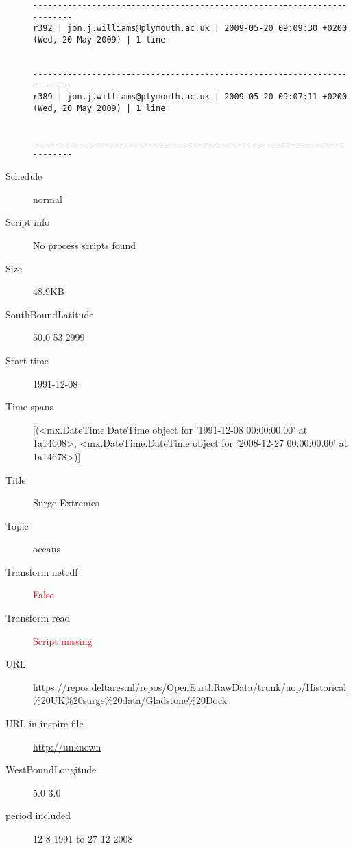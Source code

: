 \documentclass[9]{report}
\begin{document}
\begin{description}
\begin{verbatim}
------------------------------------------------------------------------
r392 | jon.j.williams@plymouth.ac.uk | 2009-05-20 09:09:30 +0200 (Wed, 20 May 2009) | 1 line


------------------------------------------------------------------------
r389 | jon.j.williams@plymouth.ac.uk | 2009-05-20 09:07:11 +0200 (Wed, 20 May 2009) | 1 line


------------------------------------------------------------------------

\end{verbatim}
  \item[Schedule] normal
  \item[Script info] No process scripts found
  \item[Size] 48.9KB
  \item[SouthBoundLatitude] 50.0 53.2999
  \item[Start time] 1991-12-08
  \item[Time spans] [(<mx.DateTime.DateTime object for '1991-12-08 00:00:00.00' at 1a14608>, <mx.DateTime.DateTime object for '2008-12-27 00:00:00.00' at 1a14678>)]
  \item[Title]  Surge Extremes 
  \item[Topic] oceans
  \item[Transform netcdf] \textcolor{red}{False}
  \item[Transform read] \textcolor{red}{Script missing}
  \item[URL] \href{https://repos.deltares.nl/repos/OpenEarthRawData/trunk/uop/Historical\%20UK\%20surge\%20data/Gladstone\%20Dock}{https://repos.deltares.nl/repos/OpenEarthRawData/trunk/uop/Historical\%20UK\%20surge\%20data/Gladstone\%20Dock}
  \item[URL in inspire file] \href{http://unknown}{http://unknown}
  \item[WestBoundLongitude] 5.0 3.0
  \item[period included] 12-8-1991 to 27-12-2008
\end{description}
\end{document}
